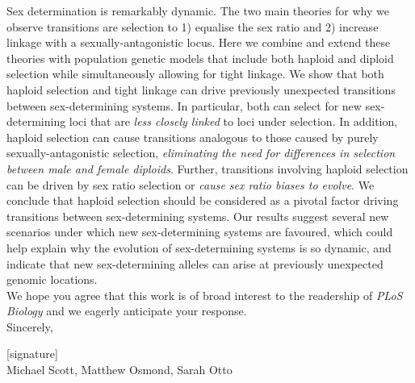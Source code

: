 \documentclass[12pt,letterpaper]{article}
\begin{document}
Sex determination is remarkably dynamic.
The two main theories for why we observe transitions are selection to 1) equalise the sex ratio and 2) increase linkage with a sexually-antagonistic locus. 
Here we combine and extend these theories with population genetic models that include both haploid and diploid selection while simultaneously allowing for tight linkage.
We show that both haploid selection and tight linkage can drive previously unexpected transitions between sex-determining systems.
In particular, both can select for new sex-determining loci that are \textit{less closely linked} to loci under selection. 
In addition, haploid selection can cause transitions analogous to those caused by purely sexually-antagonistic selection, \textit{eliminating the need for differences in selection between male and female diploids}.
Further, transitions involving haploid selection can be driven by sex ratio selection or \textit{cause sex ratio biases to evolve}. 
We conclude that haploid selection should be considered as a pivotal factor driving transitions between sex-determining systems. 
Our results suggest several new scenarios under which new sex-determining systems are favoured, which could help  explain why the evolution of sex-determining systems is so dynamic, and indicate that new sex-determining alleles can arise at previously unexpected genomic locations.
\\



We hope you agree that this work is of broad interest to the readership of \textit{PLoS Biology} and we eagerly anticipate your response.\\ 

Sincerely,

[signature]\\
\indent Michael Scott, Matthew Osmond, Sarah Otto

\end{document}
